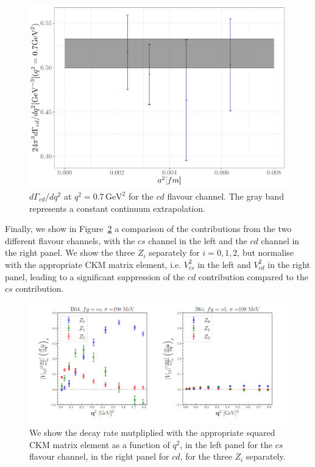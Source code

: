 \documentclass [a4paper, 11pt]{article}
\begin{document}
\begin{figure}
  \begin{center}
    \includegraphics[scale=0.7]{figures/dGamma_continuum_th9.pdf}
    \caption{$d\Gamma_{cd}/dq^2$ at $q^2=0.7\,\mathrm{GeV}^2$ for the
      $cd$ flavour channel. The gray band represents a constant
      continuum extrapolation.}
    \label{fig:dGamma_continuum}
  \end{center}
\end{figure}

Finally, we show in Figure~\ref{fig:gamma_cs_cd} a comparison of the
contributions from the two different flavour channels, with the $cs$
channel in the left and the $cd$ channel in the right panel.
We show the three $Z_i$ separately for $i=0,1,2$, but normalise with
the appropriate CKM matrix element, i.e. $V_{cs}^2$ in the left and
$V_{cd}^2$ in the right panel, leading to a significant suppression of
the $cd$ contribution compared to the $cs$ contribution.


\begin{figure}
  \begin{center}
    \includegraphics[scale=0.5]{figures/Screenshot from 2024-07-27 19-31-31.png}
    \caption{We show the decay rate mutpliplied with the appropriate
      squared CKM matrix element as a function of $q^2$, in the left
      panel for the $cs$ flavour channel, in the right panel for $cd$,
      for the three $Z_i$ separately.}
    \label{fig:gamma_cs_cd}
  \end{center}
\end{figure}
\end{document}
